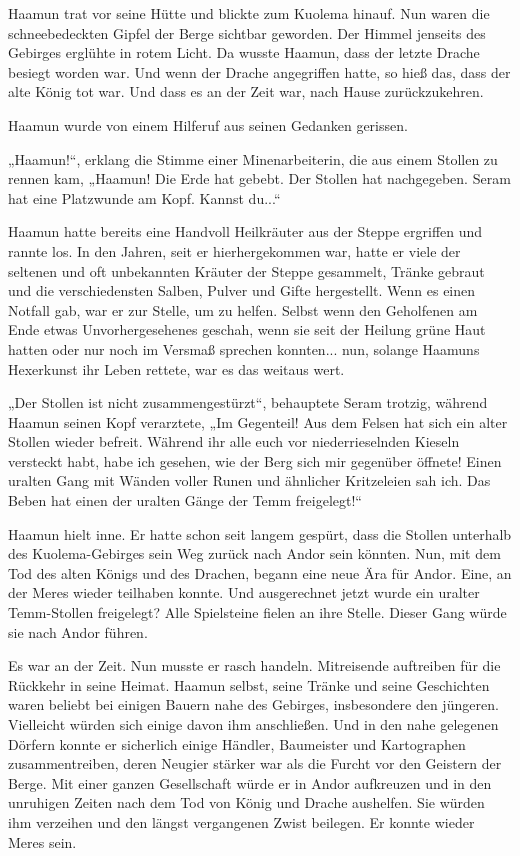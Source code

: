 Haamun trat vor seine Hütte und blickte zum Kuolema hinauf. Nun waren die schneebedeckten Gipfel der Berge sichtbar geworden. Der Himmel jenseits des Gebirges erglühte in rotem Licht. Da wusste Haamun, dass der letzte Drache besiegt worden war. Und wenn der Drache angegriffen hatte, so hieß das, dass der alte König tot war. Und dass es an der Zeit war, nach Hause zurückzukehren.

Haamun wurde von einem Hilferuf aus seinen Gedanken gerissen.

„Haamun!“, erklang die Stimme einer Minenarbeiterin, die aus einem Stollen zu rennen kam, „Haamun! Die Erde hat gebebt. Der Stollen hat nachgegeben. Seram hat eine Platzwunde am Kopf. Kannst du...“

Haamun hatte bereits eine Handvoll Heilkräuter aus der Steppe ergriffen und rannte los. In den Jahren, seit er hierhergekommen war, hatte er viele der seltenen und oft unbekannten Kräuter der Steppe gesammelt, Tränke gebraut und die verschiedensten Salben, Pulver und Gifte hergestellt. Wenn es einen Notfall gab, war er zur Stelle, um zu helfen. Selbst wenn den Geholfenen am Ende etwas Unvorhergesehenes geschah, wenn sie seit der Heilung grüne Haut hatten oder nur noch im Versmaß sprechen konnten... nun, solange Haamuns Hexerkunst ihr Leben rettete, war es das weitaus wert.

„Der Stollen ist nicht zusammengestürzt“, behauptete Seram trotzig, während Haamun seinen Kopf verarztete, „Im Gegenteil! Aus dem Felsen hat sich ein alter Stollen wieder befreit. Während ihr alle euch vor niederrieselnden Kieseln versteckt habt, habe ich gesehen, wie der Berg sich mir gegenüber öffnete! Einen uralten Gang mit Wänden voller Runen und ähnlicher Kritzeleien sah ich. Das Beben hat einen der uralten Gänge der Temm freigelegt!“

Haamun hielt inne. Er hatte schon seit langem gespürt, dass die Stollen unterhalb des Kuolema-Gebirges sein Weg zurück nach Andor sein könnten. Nun, mit dem Tod des alten Königs und des Drachen, begann eine neue Ära für Andor. Eine, an der Meres wieder teilhaben konnte. Und ausgerechnet jetzt wurde ein uralter Temm-Stollen freigelegt? Alle Spielsteine fielen an ihre Stelle. Dieser Gang würde sie nach Andor führen.

Es war an der Zeit. Nun musste er rasch handeln. Mitreisende auftreiben für die Rückkehr in seine Heimat. Haamun selbst, seine Tränke und seine Geschichten waren beliebt bei einigen Bauern nahe des Gebirges, insbesondere den jüngeren. Vielleicht würden sich einige davon ihm anschließen. Und in den nahe gelegenen Dörfern konnte er sicherlich einige Händler, Baumeister und Kartographen zusammentreiben, deren Neugier stärker war als die Furcht vor den Geistern der Berge. Mit einer ganzen Gesellschaft würde er in Andor aufkreuzen und in den unruhigen Zeiten nach dem Tod von König und Drache aushelfen. Sie würden ihm verzeihen und den längst vergangenen Zwist beilegen. Er konnte wieder Meres sein.



